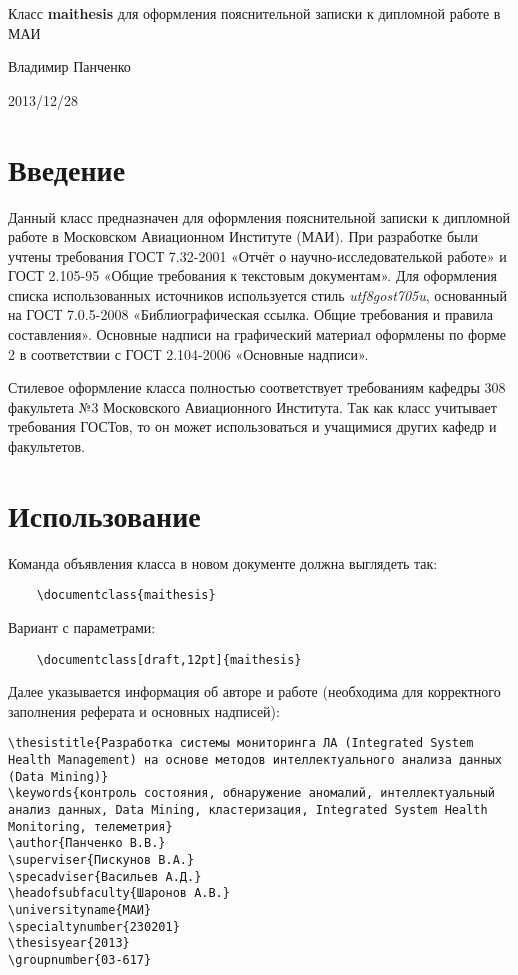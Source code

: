 \documentclass{ltxdoc}
\begin{document}
\begin{center}
\Large Класс \textbf{maithesis} для оформления пояснительной записки к дипломной работе в МАИ
\bigskip

\large Владимир Панченко
\bigskip

2013/12/28
\end{center}

\section{Введение}
Данный класс предназначен для оформления пояснительной записки к дипломной работе в Московском Авиационном Институте (МАИ). При разработке были учтены требования ГОСТ 7.32-2001 «Отчёт о научно-исследователькой работе» и ГОСТ 2.105-95 «Общие требования к текстовым документам». Для оформления списка использованных источников используется стиль \textit{utf8gost705u}, основанный на ГОСТ 7.0.5-2008 «Библиографическая ссылка. Общие требования и правила составления». Основные надписи на графический материал оформлены по форме 2 в соответствии с ГОСТ 2.104-2006 «Основные надписи».

Стилевое оформление класса полностью соответствует требованиям кафедры 308 факультета №3 Московского Авиационного Института. Так как класс учитывает требования ГОСТов, то он может использоваться и учащимися других кафедр и факультетов.

\section{Использование}
Команда объявления класса в новом документе должна выглядеть так:
\begin{verbatim}
	\documentclass{maithesis}
\end{verbatim}
Вариант с параметрами:
\begin{verbatim}
	\documentclass[draft,12pt]{maithesis}
\end{verbatim}

Далее указывается информация об авторе и работе (необходима для корректного заполнения реферата и основных надписей):
\begin{verbatim}
\thesistitle{Разработка системы мониторинга ЛА (Integrated System Health Management) на основе методов интеллектуального анализа данных (Data Mining)}
\keywords{контроль состояния, обнаружение аномалий, интеллектуальный анализ данных, Data Mining, кластеризация, Integrated System Health Monitoring, телеметрия}
\author{Панченко В.В.}
\superviser{Пискунов В.А.}
\specadviser{Васильев А.Д.}
\headofsubfaculty{Шаронов А.В.}
\universityname{МАИ}
\specialtynumber{230201}
\thesisyear{2013}
\groupnumber{03-617}
\end{verbatim}
\end{document}
